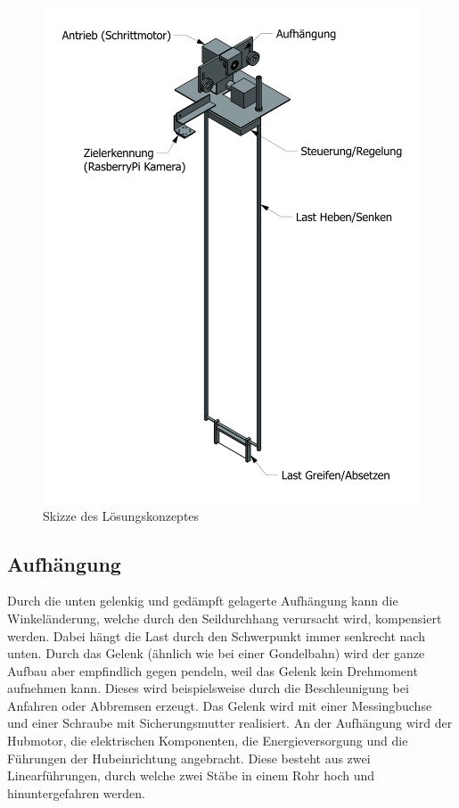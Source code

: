 \documentclass[a4paper]{report}
\begin{document}
\begin{figure}[h!]
	\centering
	\includegraphics[height=0.5\textheight,keepaspectratio]{marku_103000_bg-00_ze1}
	\caption{Skizze des Lösungskonzeptes}
	\label{fig:LoesungsKonzept}
\end{figure}

\newpage

\subsection{Aufhängung}
Durch die unten gelenkig und gedämpft gelagerte Aufhängung kann die Winkeländerung, welche durch den Seildurchhang verursacht wird, kompensiert werden. Dabei hängt die Last durch den Schwerpunkt immer senkrecht nach unten. Durch das Gelenk (ähnlich wie bei einer Gondelbahn) wird der ganze Aufbau aber empfindlich gegen pendeln, weil das Gelenk kein Drehmoment aufnehmen kann. Dieses wird beispielsweise durch die Beschleunigung bei Anfahren oder Abbremsen erzeugt. Das Gelenk wird mit einer Messingbuchse und einer Schraube mit Sicherungsmutter realisiert. An der Aufhängung wird der Hubmotor, die elektrischen Komponenten, die Energieversorgung und die Führungen der Hubeinrichtung angebracht. Diese besteht aus zwei Linearführungen, durch welche zwei Stäbe in einem Rohr hoch und hinuntergefahren werden.
\end{document}
